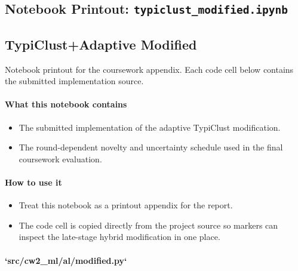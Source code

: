 \clearpage

\subsection*{Notebook Printout: \texttt{typiclust\_modified.ipynb}}
\subsection*{TypiClust+Adaptive Modified}
Notebook printout for the coursework appendix. Each code cell below contains the submitted implementation source.

\paragraph*{What this notebook contains}
\begin{itemize}
\item The submitted implementation of the adaptive TypiClust modification.
\item The round-dependent novelty and uncertainty schedule used in the final coursework evaluation.
\end{itemize}

\paragraph*{How to use it}
\begin{itemize}
\item Treat this notebook as a printout appendix for the report.
\item The code cell is copied directly from the project source so markers can inspect the late-stage hybrid modification in one place.
\end{itemize}

\paragraph*{`src/cw2\_ml/al/modified.py`}


